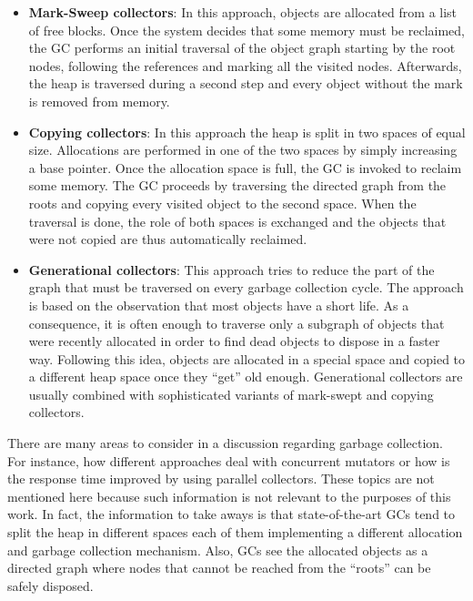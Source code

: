 \begin{itemize}
\item \textbf{Mark-Sweep collectors}: In this approach, objects are allocated from a list of free blocks.
Once the system decides that some memory must be reclaimed, the GC performs an initial traversal of the object graph starting by the root nodes, following the references and marking all the visited nodes.
Afterwards, the heap is traversed during a second step and every object without the mark is removed from memory.

\item \textbf{Copying collectors}: In this approach the heap is split in two spaces of equal size.
Allocations are performed in one of the two spaces by simply increasing a base pointer.
Once the allocation space is full, the GC is invoked to reclaim some memory.
The GC proceeds by traversing the directed graph from the roots and copying every visited object to the second space.
When the traversal is done, the role of both spaces is exchanged and the objects that were not copied are thus automatically reclaimed.

\item \textbf{Generational collectors}: This approach tries to reduce the part of the graph that must be traversed on every garbage collection cycle.
The approach is based on the observation that most objects have a short life.
As a consequence, it is often enough to traverse only a subgraph of objects that were recently allocated in order to find dead objects to dispose in a faster way.
Following this idea, objects are allocated in a special space and copied to a different heap space once they ``get'' old enough. 
Generational collectors are usually combined with sophisticated variants of mark-swept and copying collectors.
\end{itemize} 

There are many areas to consider in a discussion regarding garbage collection.
For instance, how different approaches deal with concurrent mutators or how is the response time improved by using parallel collectors.
These topics are not mentioned here because such information is not relevant to the purposes of this work.
In fact, the information to take aways is that state-of-the-art GCs tend to split the heap in different spaces each of them implementing a different allocation and garbage collection mechanism.
Also, GCs see the allocated objects as a directed graph where nodes that cannot be reached from the ``roots'' can be safely disposed.

